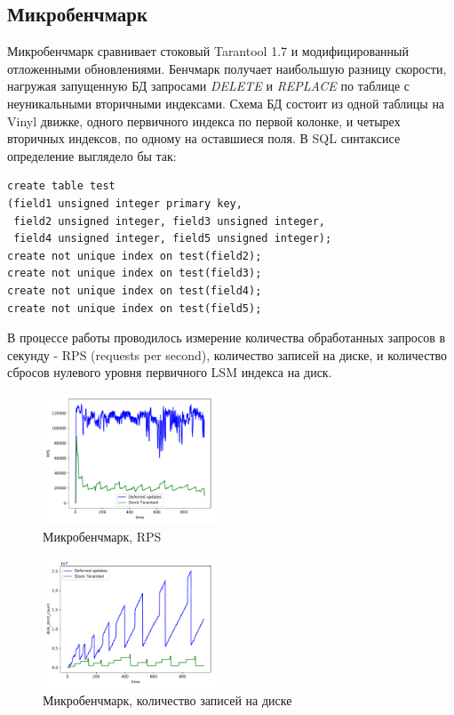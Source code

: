 \documentclass[a4paper,hidelinks,12pt]{article}
\begin{document}
\subsection{Микробенчмарк}
Микробенчмарк сравнивает стоковый Tarantool 1.7 и модифицированный отложенными
обновлениями. Бенчмарк получает наибольшую разницу скорости, нагружая запущенную
БД запросами \textit{DELETE} и \textit{REPLACE} по таблице с неуникальными
вторичными индексами. Схема БД состоит из одной таблицы на Vinyl движке, одного
первичного индекса по первой колонке, и четырех вторичных индексов, по одному на
оставшиеся поля. В SQL синтаксисе определение выглядело бы так:
\begin{verbatim}
create table test
(field1 unsigned integer primary key,
 field2 unsigned integer, field3 unsigned integer,
 field4 unsigned integer, field5 unsigned integer);
create not unique index on test(field2);
create not unique index on test(field3);
create not unique index on test(field4);
create not unique index on test(field5);
\end{verbatim}

В процессе работы проводилось измерение количества обработанных запросов в
секунду - RPS (requests per second), количество записей на диске, и количество
сбросов нулевого уровня первичного LSM индекса на диск.

\begin{figure}
\centering
\includegraphics[width=0.46\textwidth]{rps_microbench}
\caption{Микробенчмарк, RPS}
\label{fig:rps_microbench}
\end{figure}

\begin{figure}
\centering
\includegraphics[width=0.46\textwidth]{disk_stmt_microbench}
\caption{Микробенчмарк, количество записей на диске}
\label{fig:disk_stmt_microbench}
\end{figure}
\end{document}
